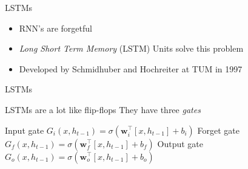 \begin{slide}{LSTMs}
  \begin{itemize}
    \item<1-> RNN's are forgetful
    \item<2-> \emph{Long Short Term Memory} (LSTM) Units solve this problem
    \item<3-> Developed by Schmidhuber and Hochreiter at TUM in 1997
  \end{itemize}
\end{slide}


\begin{slide}{LSTMs}
  \begin{itemize}
    \pitem LSTMs are a lot like flip-flops
    \pitem They have three \emph{gates}
    \begin{itemize}
      \pitem Input gate $G_i(x, h_{t-1}) = \sigma(\mathbf{w}_i^\top [x, h_{t-1}] + b_i)$
      \pitem Forget gate $G_f(x, h_{t-1}) = \sigma(\mathbf{w}_f^\top [x, h_{t-1}] + b_f)$
      \pitem Output gate $G_o(x, h_{t-1}) = \sigma(\mathbf{w}_o^\top [x, h_{t-1}] + b_o)$
    \end{itemize}
  \end{itemize}
\end{slide}

